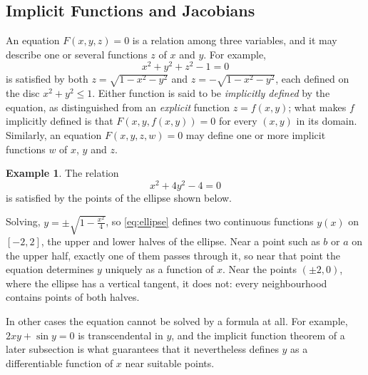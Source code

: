 \documentclass[11pt,a4paper]{article}
\theoremstyle{definition}
\newtheorem{exa}[thm]{Example}
\begin{document}
{\color[wave]{485}\subsection{Implicit Functions and Jacobians}}

An equation $F(x,y,z) = 0$ is a relation among three variables, and it may
describe one or several functions $z$ of $x$ and $y$. For example,
\[x^2 + y^2+ z^2 - 1 = 0\]
is satisfied by both $z = \sqrt{1 -x^2 -y^2}$ and $z = -\sqrt{1 -x^2 -y^2}$, each
defined on the disc $x^2 + y^2 \leq 1$. Either function is said to be
\emph{implicitly defined} by the equation, as distinguished from an
\emph{explicit} function $z = f(x,y)$; what makes $f$ implicitly defined is that
$F(x,y,f(x,y)) = 0$ for every $(x,y)$ in its domain. Similarly, an equation
$F(x,y,z,w)=0$ may define one or more implicit functions $w$ of $x$, $y$ and $z$.

\begin{exa}
\label{ex:ellipseimplicit}
The relation
\begin{equation}
x^2 + 4y^2 - 4 =0
\label{eq:ellipse}
\end{equation}
is satisfied by the points of the ellipse shown below.

\begin{figure}[H]
\centering
{}
\end{figure}

Solving, $y = \pm \sqrt{1 - \frac{x^2}{4}}$, so \eqref{eq:ellipse} defines two
continuous functions $y(x)$ on $[-2,2]$, the upper and lower halves of the
ellipse. Near a point such as $b$ or $a$ on the upper half, exactly one of them
passes through it, so near that point the equation determines $y$ uniquely as a
function of $x$. Near the points $(\pm 2, 0)$, where the ellipse has a vertical
tangent, it does not: every neighbourhood contains points of both halves.

In other cases the equation cannot be solved by a formula at all. For example,
$2xy + \sin y = 0$ is transcendental in $y$, and the implicit function theorem
of a later subsection is what guarantees that it nevertheless defines $y$ as a
differentiable function of $x$ near suitable points.
\end{exa}
\end{document}
